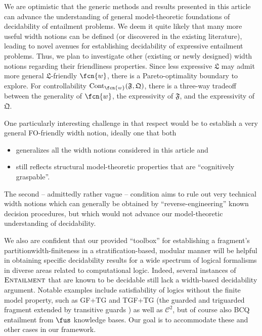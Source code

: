 We are optimistic that the generic methods and results presented in this article can advance the understanding of general model-theoretic foundations of decidability of entailment problems. We deem it quite likely that many more useful width notions can be defined (or discovered in the existing literature), leading to novel avenues for establishing decidability of expressive entailment problems. Thus, we plan to investigate other (existing or newly designed) width notions regarding their friendliness properties. Since less expressive $\mathfrak{L}$ may admit more general $\mathfrak{L}$-friendly $\fcn{w}$, there is a Pareto-optimality boundary to explore. For controllability $\mathrm{Cont}_\fcn{w}(\mathfrak{F},\mathfrak{Q})$, there is a three-way tradeoff between the generality of $\fcn{w}$, the expressivity of $\mathfrak{F}$, and the expressivity of $\mathfrak{Q}$. 

\smallskip

One particularly interesting challenge in that respect would be to establish a very general FO-friendly width notion, ideally one that both 
\begin{itemize}
\item
generalizes all the width notions considered in this article and 
\item
still reflects structural model-theoretic properties that are ``cognitively graspable''.
\end{itemize}
The second -- admittedly rather vague -- condition aims to rule out very technical width notions which can generally be obtained by ``reverse-engineering'' known decision procedures, but which would not advance our model-theoretic understanding of decidability.  

\medskip

We also are confident that our provided ``toolbox'' for establishing a fragment's partition\-width-finiteness in a stratification-based, modular manner will be helpful in obtaining specific decidability results for a wide spectrum of logical formalisms in diverse areas related to computational logic. 
Indeed, several instances of $\textsc{Entailment}$ that are known to be decidable still lack a width-based decidability argument. Notable examples include satisfiability of logics without the finite model property, such as 
GF+TG and TGF+TG (the guarded and triguarded fragment extended by transitive guards \cite{SzwastT04,KieronskiM20}) as well as $\mathcal{C}^2$, but of course also BCQ entailment from $\fus$ knowledge bases. Our goal is to accommodate these and other cases in our framework.

